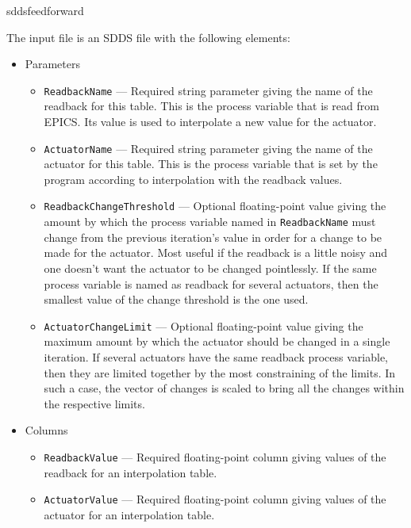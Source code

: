 \begin{sddsprog}{sddsfeedforward}
\begin{itemize}
The input file is an SDDS file with the following elements:
  \begin{itemize}
    \item Parameters
    \begin{itemize}
      \item {\tt ReadbackName} --- Required string parameter giving the name of the
        readback for this table.  This is the process variable that is read from
        EPICS.  Its value is used to interpolate a new value for the actuator.
      \item {\tt ActuatorName} --- Required string parameter giving the name of the
        actuator for this table.  This is the process variable that is set by
        the program according to interpolation with the readback values.
      \item {\tt ReadbackChangeThreshold} --- Optional floating-point value giving
        the amount by which the process variable named in {\tt ReadbackName}
        must change from the previous iteration's value in order for a
        change to be made for the actuator.  Most useful if the readback is
        a little noisy and one doesn't want the actuator to be changed
        pointlessly.  If the same process variable is named as readback for
        several actuators, then the smallest value of the change threshold
        is the one used.
      \item {\tt ActuatorChangeLimit} --- Optional floating-point value giving
        the maximum amount by which the actuator should be changed in a
        single iteration.  If several actuators have the same
        readback process variable, then they are limited together by the
        most constraining of the limits.  In such a case, the vector of
        changes is scaled to bring all the changes within the respective
        limits.
    \end{itemize}
    \item Columns
    \begin{itemize}
      \item {\tt ReadbackValue} --- Required floating-point column giving values
        of the readback for an interpolation table.
      \item {\tt ActuatorValue} --- Required floating-point column giving values
        of the actuator for an interpolation table.
    \end{itemize}
  \end{itemize}


\end{itemize}
\end{sddsprog}
